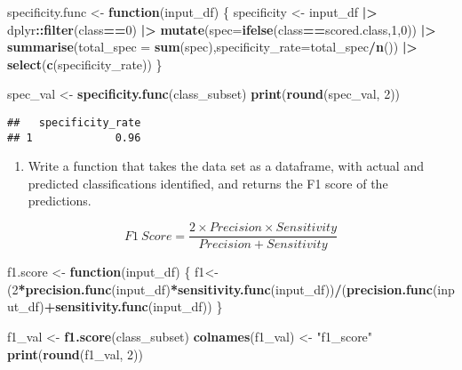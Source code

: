 \documentclass[
]{article}
\newenvironment{Shaded}{\begin{snugshade}}{\end{snugshade}}
\newcommand{\AttributeTok}[1]{\textcolor[rgb]{0.13,0.29,0.53}{#1}}
\newcommand{\ControlFlowTok}[1]{\textcolor[rgb]{0.13,0.29,0.53}{\textbf{#1}}}
\newcommand{\DecValTok}[1]{\textcolor[rgb]{0.00,0.00,0.81}{#1}}
\newcommand{\FunctionTok}[1]{\textcolor[rgb]{0.13,0.29,0.53}{\textbf{#1}}}
\newcommand{\NormalTok}[1]{#1}
\newcommand{\OtherTok}[1]{\textcolor[rgb]{0.56,0.35,0.01}{#1}}
\newcommand{\SpecialCharTok}[1]{\textcolor[rgb]{0.81,0.36,0.00}{\textbf{#1}}}
\newcommand{\StringTok}[1]{\textcolor[rgb]{0.31,0.60,0.02}{#1}}
\providecommand{\tightlist}{%
  \setlength{\itemsep}{0pt}\setlength{\parskip}{0pt}}
\begin{document}
\begin{Shaded}
\begin{Highlighting}[]
\NormalTok{specificity.func }\OtherTok{\textless{}{-}} \ControlFlowTok{function}\NormalTok{(input\_df) \{}
\NormalTok{    specificity }\OtherTok{\textless{}{-}}\NormalTok{ input\_df }\SpecialCharTok{|\textgreater{}}\NormalTok{ dplyr}\SpecialCharTok{::}\FunctionTok{filter}\NormalTok{(class}\SpecialCharTok{==}\DecValTok{0}\NormalTok{) }\SpecialCharTok{|\textgreater{}} \FunctionTok{mutate}\NormalTok{(}\AttributeTok{spec=}\FunctionTok{ifelse}\NormalTok{(class}\SpecialCharTok{==}\NormalTok{scored.class,}\DecValTok{1}\NormalTok{,}\DecValTok{0}\NormalTok{)) }\SpecialCharTok{|\textgreater{}} 
        \FunctionTok{summarise}\NormalTok{(}\AttributeTok{total\_spec =} \FunctionTok{sum}\NormalTok{(spec),}\AttributeTok{specificity\_rate=}\NormalTok{total\_spec}\SpecialCharTok{/}\FunctionTok{n}\NormalTok{()) }\SpecialCharTok{|\textgreater{}} \FunctionTok{select}\NormalTok{(}\FunctionTok{c}\NormalTok{(specificity\_rate))}
\NormalTok{\}}

\NormalTok{spec\_val }\OtherTok{\textless{}{-}} \FunctionTok{specificity.func}\NormalTok{(class\_subset)}
\FunctionTok{print}\NormalTok{(}\FunctionTok{round}\NormalTok{(spec\_val, }\DecValTok{2}\NormalTok{))}
\end{Highlighting}
\end{Shaded}

\begin{verbatim}
##   specificity_rate
## 1             0.96
\end{verbatim}

\begin{enumerate}
\def\labelenumi{\arabic{enumi}.}
\setcounter{enumi}{7}
\tightlist
\item
  Write a function that takes the data set as a dataframe, with actual
  and predicted classifications identified, and returns the F1 score of
  the predictions.
\end{enumerate}

\[F1\ Score = \frac{2 \times Precision \times Sensitivity}{Precision + Sensitivity}\]

\begin{Shaded}
\begin{Highlighting}[]
\NormalTok{f1.score }\OtherTok{\textless{}{-}} \ControlFlowTok{function}\NormalTok{(input\_df) \{}
\NormalTok{    f1}\OtherTok{\textless{}{-}}\NormalTok{(}\DecValTok{2}\SpecialCharTok{*}\FunctionTok{precision.func}\NormalTok{(input\_df)}\SpecialCharTok{*}\FunctionTok{sensitivity.func}\NormalTok{(input\_df))}\SpecialCharTok{/}\NormalTok{(}\FunctionTok{precision.func}\NormalTok{(input\_df)}\SpecialCharTok{+}\FunctionTok{sensitivity.func}\NormalTok{(input\_df))}
\NormalTok{\}}

\NormalTok{f1\_val }\OtherTok{\textless{}{-}} \FunctionTok{f1.score}\NormalTok{(class\_subset)}
\FunctionTok{colnames}\NormalTok{(f1\_val) }\OtherTok{\textless{}{-}} \StringTok{"f1\_score"}
\FunctionTok{print}\NormalTok{(}\FunctionTok{round}\NormalTok{(f1\_val, }\DecValTok{2}\NormalTok{))}
\end{Highlighting}
\end{Shaded}
\end{document}
